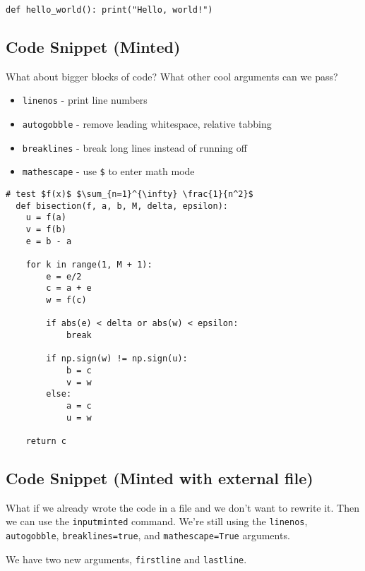 \documentclass{article}
\begin{document}
\texttt{def hello_world(): print("Hello, world!")}


\subsection{Code Snippet (Minted)}

What about bigger blocks of code? What other cool arguments can we pass?
\begin{itemize}
    \item \texttt{linenos} - print line numbers
    \item \texttt{autogobble} - remove leading whitespace, relative tabbing
    \item \texttt{breaklines} - break long lines instead of running off
    \item \texttt{mathescape} - use \texttt{\$} to enter math mode
\end{itemize}

\begin{verbatim}
# test $f(x)$ $\sum_{n=1}^{\infty} \frac{1}{n^2}$
  def bisection(f, a, b, M, delta, epsilon):
    u = f(a)
    v = f(b)
    e = b - a

    for k in range(1, M + 1):
        e = e/2
        c = a + e
        w = f(c)

        if abs(e) < delta or abs(w) < epsilon:
            break

        if np.sign(w) != np.sign(u):
            b = c
            v = w
        else:
            a = c
            u = w

    return c
\end{verbatim}
\subsection{Code Snippet (Minted with external file)}

What if we already wrote the code in a file and we don't want to
rewrite it. Then we can use the \texttt{inputminted} command.
We're still using the \texttt{linenos}, \texttt{autogobble}, \texttt{breaklines=true},
and \texttt{mathescape=True} arguments.

We have two new arguments, \texttt{firstline} and \texttt{lastline}.

\inputminted[linenos, autogobble, breaklines=true, mathescape=true, firstline=6, lastline=41]{python}{./algorithms/algorithms.py}
\end{document}
